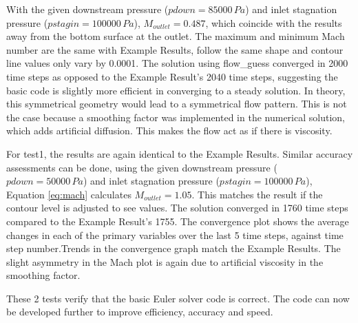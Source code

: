 \documentclass[12pt, a4paper]{article}
\begin{document}
With the given downstream pressure ($pdown=85000\,Pa$) and inlet stagnation pressure ($pstagin=100000\,Pa$), $M_{outlet}=0.487$, which coincide with the results away from the bottom surface at the outlet. The maximum and minimum Mach number are the same with Example Results, follow the same shape and contour line values only vary by 0.0001. The solution using flow\_guess converged in 2000 time steps as opposed to the Example Result's 2040 time steps, suggesting the basic code is slightly more efficient in converging to a steady solution. In theory, this symmetrical geometry would lead to a symmetrical flow pattern. This is not the case because a smoothing factor was implemented in the numerical solution, which adds artificial diffusion. This makes the flow act as if there is viscosity.

For test1, the results are again identical to the Example Results. Similar accuracy assessments can be done, using the given downstream pressure ($pdown=50000\,Pa$) and inlet stagnation pressure ($pstagin=100000\,Pa$), Equation \ref{eq:mach} calculates $M_{outlet}=1.05$. This matches the result if the contour level is adjusted to see values. The solution converged in 1760 time steps compared to the Example Result's 1755. The convergence plot shows the average changes in each of the primary variables over the last 5 time steps, against time step number.Trends in the convergence graph match the Example Results. The slight asymmetry in the Mach plot is again due to artificial viscosity in the smoothing factor.

These 2 tests verify that the basic Euler solver code is correct. The code can now be developed further to improve efficiency, accuracy and speed. 
\end{document}

